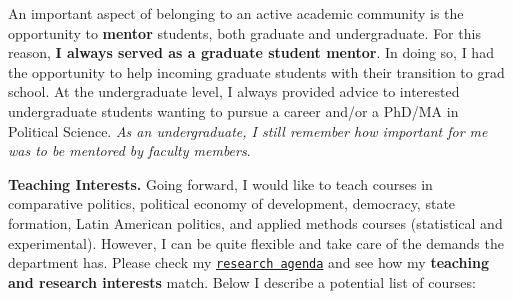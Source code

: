 An important aspect of belonging to an active academic community is the opportunity to {\bf mentor} students, both graduate and undergraduate. For this reason, {\bf I always served as a graduate student mentor}. In doing so, I had the opportunity to help incoming graduate students with their transition to grad school. At the undergraduate level, I always provided advice to interested undergraduate students wanting to pursue a career and/or a PhD/MA in Political Science. \emph{As an undergraduate, I still remember how important for me was to be mentored by faculty members}.

{\bf Teaching Interests.} Going forward, I would like to teach courses in comparative politics, political economy of development, democracy, state formation, Latin American politics, and applied methods courses (statistical and experimental). However, I can be quite flexible and take care of the demands the department has. Please check my \href{http://www.hectorbahamonde.com/research/}{\texttt{research agenda}} and see how my {\bf teaching and research interests} match. Below I describe a potential list of courses:
